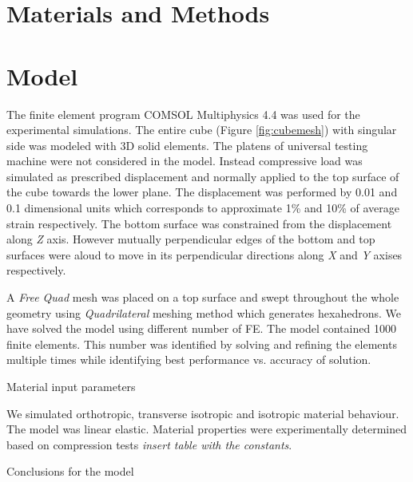 \documentclass[review]{elsarticle}
\begin{document}
\section{Materials and Methods}
\section{Model}

The finite element program COMSOL Multiphysics 4.4 \cite{Comsol} was used for
the experimental simulations.
The entire cube (Figure \ref{fig:cubemesh})  with singular side was modeled with
3D solid elements.
The platens of universal testing machine were not considered in the model.
Instead compressive load was simulated as prescribed displacement and normally
applied to the top surface of the cube towards the lower plane. The
displacement was performed by 0.01 and 0.1 dimensional units which corresponds
to approximate 1\%  and 10\% of average strain respectively. The bottom surface
was constrained from the displacement along \textit{Z} axis. However mutually perpendicular edges of the bottom and top surfaces were aloud to move in its perpendicular directions along \textit{X} and \textit{Y} axises respectively.

A \textit{Free Quad} mesh was placed on a top surface and swept throughout
the whole geometry using \textit{Quadrilateral} meshing method which generates
hexahedrons. We have solved the model using different number of FE. The model
contained 1000 finite elements. This number was identified by solving and
refining the elements multiple times while identifying best performance vs.
accuracy of solution. 

\begin{description}
\item[{\color {red}Material input parameters}]
\end{description}
We simulated orthotropic, transverse isotropic and isotropic material behaviour.
The model was linear elastic. Material properties were experimentally determined
based on compression tests \textit{insert table with the constants}.  

\begin{description}
\item[{\color {red}Conclusions for the model}]
\end{description}
\end{document}

